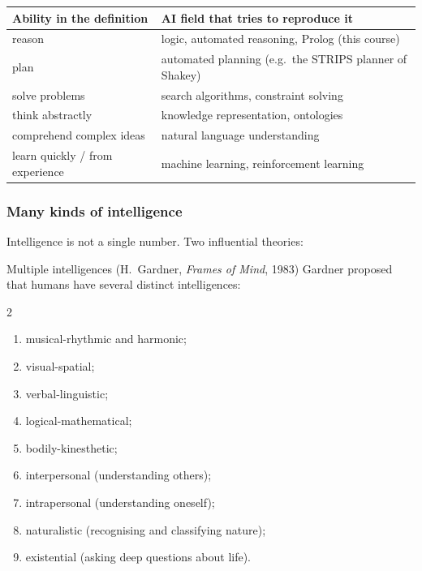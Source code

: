 \begin{center}
\small
\begin{tabular}{@{}ll@{}}
\toprule
\textbf{Ability in the definition} & \textbf{AI field that tries to reproduce it} \\
\midrule
reason                          & logic, automated reasoning, Prolog (this course) \\
plan                            & automated planning (e.g.\ the STRIPS planner of Shakey) \\
solve problems                  & search algorithms, constraint solving \\
think abstractly                & knowledge representation, ontologies \\
comprehend complex ideas        & natural language understanding \\
learn quickly / from experience & machine learning, reinforcement learning \\
\bottomrule
\end{tabular}
\end{center}

\subsubsection{Many kinds of intelligence}

Intelligence is not a single number. Two influential theories:

\begin{nbdef}{Multiple intelligences (H.~Gardner, \emph{Frames of Mind}, 1983)}
Gardner proposed that humans have several distinct intelligences:
\begin{multicols}{2}
\begin{enumerate}[nosep]
  \item musical-rhythmic and harmonic;
  \item visual-spatial;
  \item verbal-linguistic;
  \item logical-mathematical;
  \item bodily-kinesthetic;
  \item interpersonal (understanding others);
  \item intrapersonal (understanding oneself);
  \item naturalistic (recognising and classifying nature);
  \item existential (asking deep questions about life).
\end{enumerate}
\end{multicols}
\end{nbdef}

